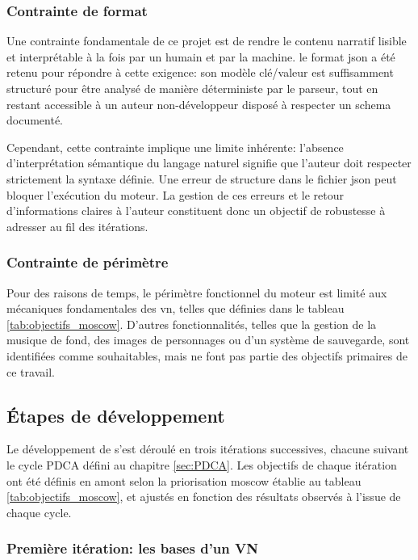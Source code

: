 \subsubsection{Contrainte de format}

Une contrainte fondamentale de ce projet est de rendre le contenu narratif lisible et interprétable à la fois par un humain et par la machine. le format \gls{json} a été retenu pour répondre à cette exigence: son modèle clé/valeur est suffisamment structuré pour être analysé de manière déterministe par le \gls{parseur}, tout en restant accessible à un auteur non-développeur disposé à respecter un \gls{schema} documenté.

Cependant, cette contrainte implique une limite inhérente: l'absence d'interprétation sémantique du langage naturel signifie que l'auteur doit respecter strictement la \gls{syntaxe} définie. Une erreur de structure dans le fichier \gls{json} peut bloquer l'exécution du moteur. La gestion de ces erreurs et le retour d'informations claires à l'auteur constituent donc un objectif de robustesse à adresser au fil des itérations.


\subsubsection{Contrainte de périmètre}

Pour des raisons de temps, le périmètre fonctionnel du moteur est limité aux mécaniques fondamentales des \gls{vn}, telles que définies dans le tableau \ref{tab:objectifs_moscow}. D'autres fonctionnalités, telles que la gestion de la musique de fond, des images de personnages ou d'un système de sauvegarde, sont identifiées comme souhaitables, mais ne font pas partie des objectifs primaires de ce travail.


\subsection{Étapes de développement}

Le développement de \nsits s'est déroulé en trois itérations successives, chacune suivant  le cycle PDCA défini au chapitre \ref{sec:PDCA}. Les objectifs de chaque itération ont été définis en amont selon la priorisation \gls{moscow} établie au tableau \ref{tab:objectifs_moscow}, et ajustés en fonction des résultats observés à l'issue de chaque cycle.


\subsubsection{Première itération: les bases d'un VN}



